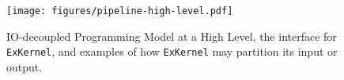 \begin{comment}
With the assumption that the bandwidth between CPU and GPU is the most significant bottleneck, many of the prior GPU data processing research that target datasets beyond GPU capacity co-design the CPU-GPU IO patterns and on-GPU compute kernels~\cite{triton-join, pump-up-volume, gowan-ipdpsw-2018, sioulas-icde-2019, rui-vldb2020}. 
While achieving encouraging results, such a strategy couples the already complicated design space of IO management and GPU kernel design, further intricating the reasoning process and introducing ad-hoc GPU optimization techniques.
Besides, it prevents the proposed solution from reusing many optimized and verified GPU kernels maintained by GPU vendors like NVidia and AMD, as they are not designed for out-of-core processing.

We argue that because \texttt{Exchange} greatly relieves the IO bottleneck, we can adopt a decoupled programming model that considers IO activities and on-GPU kernels separately, instead of together.
Such a programming model enforces the separation of concern and encourages code reuse, while still achieving satisfactory performance.
The on-GPU code does not require special designs to process data on the CPU.
Thus, the programmers can write GPU kernels with a classic single-GPU model in mind, and reuse the code originally designed only to process data fit in GPU memory.
On the other hand, as long as programmers specify how the data should be partitioned to fit inside GPU memory, the framework under the programming models takes care of all the IO orchestration. 

The right-hand side of Figure~\ref{fig:pipeline-high-level} overviews the proposed programming model.
The programmers extend their on-GPU kernels to \texttt{ExKernel}s, an abbreviation for \texttt{\textbf{Ex}}tended \texttt{\textbf{Kernel}}. 
\texttt{ExKernel}s process large input data only fit in the DRAM and save the result back to the DRAM.
\texttt{ExKernel}s are executed by a \texttt{Pipelined Executor}, which uses \texttt{Exchange} to perform off-GPU IO.
Implementing an \texttt{ExKernel} for an on-GPU kernel enables it to process out-of-core data, and naturally maximizes the utilization of all PCIe bandwidth.
\end{comment}

\begin{figure}[t]
    \centering
    \texttt{[image: figures/pipeline-high-level.pdf]}
    \caption{IO-decoupled Programming Model at a High Level, the interface for \texttt{ExKernel}, and examples of how \texttt{ExKernel} may partition its input or output. }
    \label{fig:pipeline-high-level}
\end{figure}

